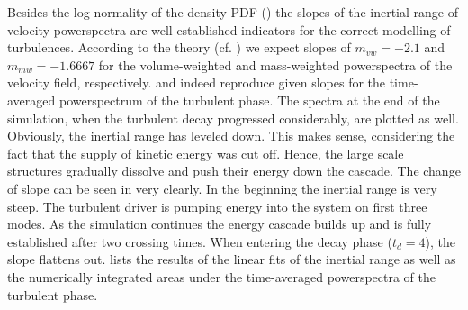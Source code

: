 
Besides the log-normality of the density PDF () the
slopes of the inertial range of velocity powerspectra are well-established
indicators for the correct modelling of turbulences. According to the theory
(cf.  ) we expect slopes of $m_{vw} =
-2.1$ and $m_{mw} = -1.6667$ for the volume-weighted and mass-weighted
powerspectra of the velocity field, respectively.
 and
 indeed reproduce
given slopes for the time-averaged powerspectrum of the turbulent phase.  The
spectra at the end of the simulation, when the turbulent decay progressed
considerably, are plotted as well. Obviously, the inertial range has leveled
down. This makes sense, considering the fact that the supply of kinetic energy
was cut off. Hence, the large scale structures gradually dissolve and
push their energy down the cascade. The change of slope can be seen in
 very clearly. In
the beginning the inertial range is very steep. The turbulent driver is pumping
energy into the system on first three modes. As the simulation continues the
energy cascade builds up and is fully established after two crossing times.
When entering the decay phase ($t_d = 4$), the slope flattens out.
 lists the results of the linear fits of the inertial range
as well as the numerically integrated areas under the time-averaged powerspectra
of the turbulent phase.

